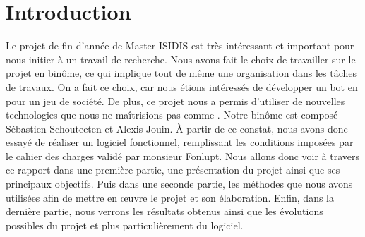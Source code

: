 \section{Introduction}
Le projet de fin d'année de Master ISIDIS est très intéressant et important pour nous initier à un travail de recherche.
Nous avons fait le choix de travailler sur le projet \himalaya en binôme, ce qui implique tout de même une organisation dans les tâches de travaux.
On a fait ce choix, car nous étions intéressés de développer un bot en \java pour un jeu de société.
De plus, ce projet nous a permis d’utiliser de nouvelles technologies que nous ne maîtrisions pas comme \fx.
Notre binôme est composé Sébastien Schouteeten et Alexis Jouin.
À partir de ce constat, nous avons donc essayé de réaliser un logiciel fonctionnel, remplissant les conditions imposées par le cahier des charges validé par monsieur Fonlupt. Nous allons donc voir à travers ce rapport dans une première partie, une présentation du projet ainsi que ses principaux objectifs. Puis dans une seconde partie, les méthodes que nous avons utilisées afin de mettre en \oe uvre le projet et son élaboration. Enfin, dans la dernière partie, nous verrons les résultats obtenus ainsi que les évolutions possibles du projet et plus particulièrement du logiciel.